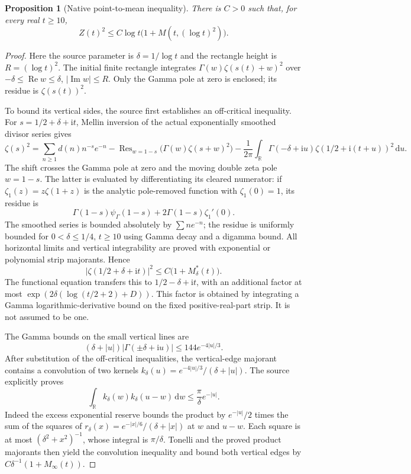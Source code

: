 \documentclass[11pt,a4paper]{article}
\numberwithin{equation}{section}
\newtheorem{proposition}[theorem]{Proposition}
\theoremstyle{definition}
\newcommand{\R}{\mathbb R}
\newcommand{\dd}{\,\mathrm d}
\newcommand{\ii}{\mathrm i}
\newcommand{\Rea}{\operatorname{Re}}
\newcommand{\Ima}{\operatorname{Im}}
\newcommand{\zabs}{Z}
\begin{document}
\begin{proposition}[Native point-to-mean inequality]\label{prop:pointmean}
There is $C>0$ such that, for every real $t\ge10$,
\[
 \zabs(t)^2\le C\log t\bigl(1+M(t,(\log t)^2)\bigr).
\]
\end{proposition}
\begin{proof}
Here the source parameter is $\delta=1/\log t$ and the rectangle height is
$R=(\log t)^2$. The initial finite rectangle integrates
$\Gamma(w)\zeta(s(t)+w)^2$ over $-\delta\le\Rea w\le\delta$,
$|\Ima w|\le R$. Only the Gamma pole at zero is enclosed; its residue is
$\zeta(s(t))^2$.

To bound its vertical sides, the source first establishes an off-critical
inequality. For $s=1/2+\delta+\ii t$, Mellin inversion of the actual
exponentially smoothed divisor series gives
\[
 \zeta(s)^2=\sum_{n\ge1}d(n)n^{-s}e^{-n}
     -\operatorname{Res}_{w=1-s}\bigl(\Gamma(w)\zeta(s+w)^2\bigr)
     -\frac1{2\pi}\int_{\R}\Gamma(-\delta+\ii u)
                    \zeta(1/2+\ii(t+u))^2\dd u.
\]
The shift crosses the Gamma pole at zero and the moving double zeta pole
$w=1-s$. The latter is evaluated by differentiating its cleared numerator:
if $\zeta_1(z)=z\zeta(1+z)$ is the analytic pole-removed function with
$\zeta_1(0)=1$, its residue is
\[
 \Gamma(1-s)\psi_\Gamma(1-s)+2\Gamma(1-s)\zeta_1'(0).
\]
The smoothed series is bounded absolutely by $\sum n e^{-n}$; the residue is
uniformly bounded for $0<\delta\le1/4$, $t\ge10$ using Gamma decay and a
digamma bound. All horizontal limits and vertical integrability are proved
with exponential or polynomial strip majorants. Hence
\[
 |\zeta(1/2+\delta+\ii t)|^2\le C\bigl(1+M_\delta^*(t)\bigr).
\]
The functional equation transfers this to $1/2-\delta+\ii t$, with an
additional factor at most
$\exp(2\delta(\log(t/2+2)+D))$. This factor is obtained by integrating a
Gamma logarithmic-derivative bound on the fixed positive-real-part strip.
It is not assumed to be one.

The Gamma bounds on the small vertical lines are
\[
 (\delta+|u|)|\Gamma(\pm\delta+\ii u)|\le144e^{-4|u|/3}.
\]
After substitution of the off-critical inequalities, the vertical-edge
majorant contains a convolution of two kernels
$k_\delta(u)=e^{-4|u|/3}/(\delta+|u|)$.
The source explicitly proves
\[
 \int_{\R}k_\delta(w)k_\delta(u-w)\dd w
 \le\frac\pi\delta e^{-|u|}.
\]
Indeed the excess exponential reserve bounds the product by
$e^{-|u|}/2$ times the sum of the squares of
$r_\delta(x)=e^{-|x|/6}/(\delta+|x|)$ at $w$ and $u-w$.
Each square is at most $(\delta^2+x^2)^{-1}$, whose integral is
$\pi/\delta$. Tonelli and the proved product majorants then yield the
convolution inequality and bound both vertical edges by
$C\delta^{-1}(1+M_\infty(t))$.


\end{proof}
\end{document}
